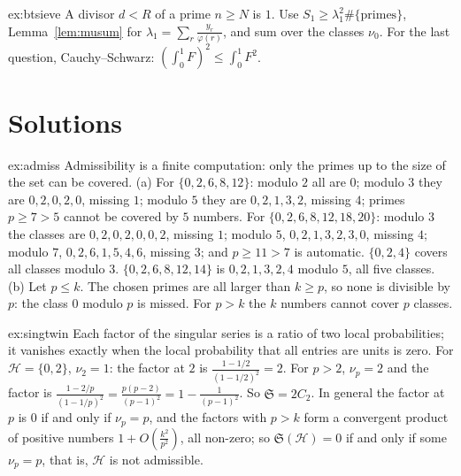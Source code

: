 \begin{hint}{ex:btsieve}
A divisor $d<R$ of a prime $n\ge N$ is $1$. Use $S_1\ge\lambda_1^2\#\{\text{primes}\}$, Lemma~\ref{lem:musum} for $\lambda_1=\sum_r\frac{y_r}{\varphi(r)}$, and sum over the classes $\nu_0$. For the last question, Cauchy--Schwarz: $(\int_0^1F)^2\le\int_0^1F^2$.
\end{hint}

\section{Solutions}

\begin{solution}{ex:admiss}
\idea Admissibility is a finite computation: only the primes up to the size of the set can be covered.
\writeup (a) For $\{0,2,6,8,12\}$: modulo $2$ all are $0$; modulo $3$ they are $0,2,0,2,0$, missing $1$; modulo $5$ they are $0,2,1,3,2$, missing $4$; primes $p\ge7>5$ cannot be covered by $5$ numbers. For $\{0,2,6,8,12,18,20\}$: modulo $3$ the classes are $0,2,0,2,0,0,2$, missing $1$; modulo $5$, $0,2,1,3,2,3,0$, missing $4$; modulo $7$, $0,2,6,1,5,4,6$, missing $3$; and $p\ge11>7$ is automatic. $\{0,2,4\}$ covers all classes modulo $3$. $\{0,2,6,8,12,14\}$ is $0,2,1,3,2,4$ modulo $5$, all five classes.
(b) Let $p\le k$. The chosen primes are all larger than $k\ge p$, so none is divisible by $p$: the class $0$ modulo $p$ is missed. For $p>k$ the $k$ numbers cannot cover $p$ classes.
\end{solution}

\begin{solution}{ex:singtwin}
\idea Each factor of the singular series is a ratio of two local probabilities; it vanishes exactly when the local probability that all entries are units is zero.
\writeup For $\mathcal H=\{0,2\}$, $\nu_2=1$: the factor at $2$ is $\frac{1-1/2}{(1-1/2)^2}=2$. For $p>2$, $\nu_p=2$ and the factor is $\frac{1-2/p}{(1-1/p)^2}=\frac{p(p-2)}{(p-1)^2}=1-\frac1{(p-1)^2}$. So $\mathfrak S=2C_2$. In general the factor at $p$ is $0$ if and only if $\nu_p=p$, and the factors with $p>k$ form a convergent product of positive numbers $1+O(\frac{k^2}{p^2})$, all non-zero; so $\mathfrak S(\mathcal H)=0$ if and only if some $\nu_p=p$, that is, $\mathcal H$ is not admissible.
\end{solution}

